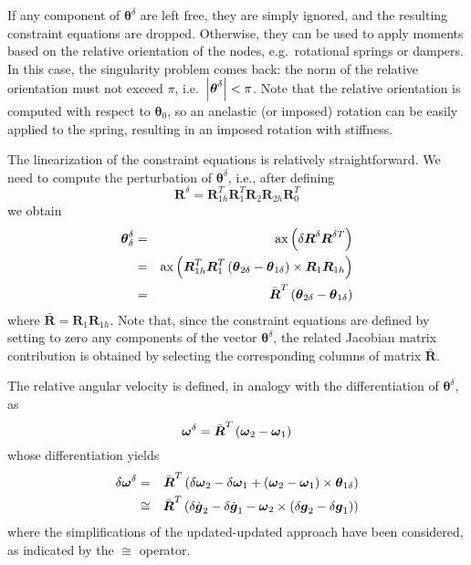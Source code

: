 \documentclass[10pt,dvips,fleqn]{report}
\newcommand{\T}[1]{\boldsymbol{#1}}
\begin{document}
\noindent
If any component of $\T{\theta}^{\delta}$ are left free, they are
simply ignored, and the resulting constraint equations are dropped.
Otherwise, they can be used to apply moments based on the 
relative orientation of the nodes, e.g.\ rotational springs or 
dampers.
In this case, the singularity problem comes back: the norm
of the relative orientation must not exceed $\pi$, i.e.\
$\shbr{\T{\theta}^{\delta}}<\pi$.
Note that the relative orientation is computed with respect to 
$\T{\theta}_0$, so an anelastic (or imposed) rotation can be easily
applied to the spring, resulting in an imposed rotation with stiffness.

\noindent
The linearization of the constraint equations is relatively 
straightforward. 
We need to compute the perturbation of $\T{\theta}^{\delta}$, i.e.,
after defining
\begin{equation}
	\T{R}^{\delta} = \T{R}_{1h}^T \T{R}_1^T \T{R}_2 \T{R}_{2h} \T{R}_0^T
\end{equation}
we obtain
\begin{eqnarray*}
	\T{\theta}^{\delta}_{\delta}
	& = & \llk{ax}\plbr{\delta\T{R}^{\delta} \T{R}^{\delta T}} \\
	& = & \llk{ax}\plbr{\T{R}_{1h}^T \T{R}_1^T
		\plbr{\T{\theta}_{2\delta} - \T{\theta}_{1\delta}}\times{}
		\T{R}_1 \T{R}_{1h}} \\
	& = & \bar{\T{R}}^T\plbr{\T{\theta}_{2\delta} - \T{\theta}_{1\delta}}
\end{eqnarray*}
where $\bar{\T{R}}=\T{R}_1 \T{R}_{1h}$.
Note that, since the constraint equations are defined by setting 
to zero any components of the vector $\T{\theta}^{\delta}$, the
related Jacobian matrix contribution is obtained by selecting 
the corresponding columns of matrix $\bar{\T{R}}$.

\noindent
The relative angular velocity is defined, in analogy with 
the differentiation of $\T{\theta}^{\delta}$, as
\begin{equation}
	\T{\omega}^{\delta} = \bar{\T{R}}^T\plbr{\T{\omega}_2 - \T{\omega}_1}
\end{equation}
whose differentiation yields
\begin{eqnarray*}
	\delta\T{\omega}^{\delta}
	& = & \bar{\T{R}}^T \plbr{
		\delta\T{\omega}_2
		- \delta\T{\omega}_1
		+ \plbr{\T{\omega}_2 - \T{\omega}_1}\times
			\T{\theta}_{1\delta}
	} \\
	& \cong & \bar{\T{R}}^T \plbr{
		\delta\dot{\T{g}}_2
		- \delta\dot{\T{g}}_1
		- \T{\omega}_2\times\plbr{\delta\T{g}_2 - \delta\T{g}_1}
	}
\end{eqnarray*}
where the simplifications of the updated-updated approach 
have been considered, as indicated by the $\cong$ operator.
\end{document}
